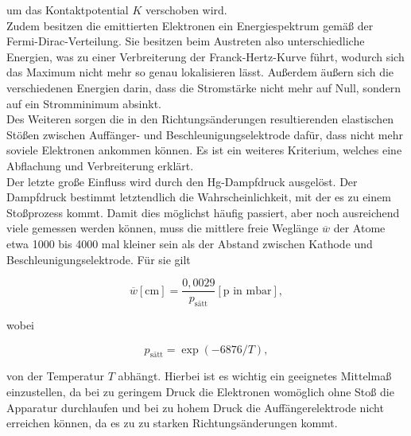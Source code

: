 um das Kontaktpotential $K$ verschoben wird.\\
Zudem besitzen die emittierten Elektronen ein Energiespektrum gemäß der Fermi-Dirac-Verteilung.
Sie besitzen beim Austreten also unterschiedliche Energien, was zu einer Verbreiterung der Franck-Hertz-Kurve führt, wodurch sich das Maximum nicht mehr so genau lokalisieren lässt.
Außerdem äußern sich die verschiedenen Energien darin, dass die Stromstärke nicht mehr auf Null, sondern auf ein Stromminimum absinkt.\\
Des Weiteren sorgen die in den Richtungsänderungen resultierenden elastischen Stößen zwischen Auffänger- und Beschleunigungselektrode dafür, dass nicht mehr soviele Elektronen ankommen können.
Es ist ein weiteres Kriterium, welches eine Abflachung und Verbreiterung erklärt.\\
Der letzte große Einfluss wird durch den Hg-Dampfdruck ausgelöst.
Der Dampfdruck bestimmt letztendlich die Wahrscheinlichkeit, mit der es zu einem Stoßprozess kommt.
Damit dies möglichst häufig passiert, aber noch ausreichend viele gemessen werden können, muss die mittlere freie Weglänge $\overline{w}$ der Atome etwa 1000 bis 4000 mal kleiner sein als der Abstand zwischen Kathode und Beschleunigungselektrode.
Für sie gilt

\begin{equation}
  \overline{w} [\text{cm}] = \frac{0,0029}{p_{\text{sätt}}} [\text{p in mbar}] \label{eqn:7},
\end{equation}

wobei

\begin{equation}
  p_{\text{sätt}} = \exp(-6876/T) \label{eqn:8},
\end{equation}

von der Temperatur $T$ abhängt.
Hierbei ist es wichtig ein geeignetes Mittelmaß einzustellen, da bei zu geringem Druck die Elektronen womöglich ohne Stoß die Apparatur durchlaufen und bei zu hohem Druck die Auffängerelektrode nicht erreichen können, da es zu zu starken Richtungsänderungen kommt.








